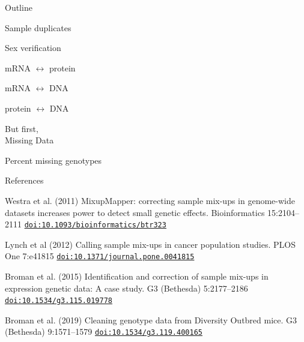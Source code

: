 \documentclass[12pt,t,aspectratio=169]{beamer}
\begin{document}
\begin{frame}[c]{Outline}

  \bbi
\item Sample duplicates
\item Sex verification
\item mRNA $\leftrightarrow$ protein
\item mRNA $\leftrightarrow$ DNA
\item protein $\leftrightarrow$ DNA
  \ei

\end{frame}




\begin{frame}[c]{}

  \centering
  \LARGE

  {\color{title} But first,} \\[24pt]

  {\vhilit Missing Data}

\end{frame}


\begin{frame}[c]{Percent missing genotypes}
\end{frame}










\begin{frame}[c]{References}

  \bbi

  \item Westra et al. (2011) MixupMapper: correcting sample mix-ups in
    genome-wide datasets increases power to detect small genetic
    effects. Bioinformatics 15:2104--2111
    \href{https://doi.org/10.1093/bioinformatics/btr323}{\tt doi:10.1093/bioinformatics/btr323}

  \item Lynch et al (2012) Calling sample mix-ups in cancer population
    studies. PLOS One 7:e41815
    \href{https://doi.org/10.1371/journal.pone.0041815}{\tt doi:10.1371/journal.pone.0041815}

  \item Broman et al. (2015) Identification and correction of sample
    mix-ups in expression genetic data: A case study. G3 (Bethesda)
    5:2177--2186
    \href{https://doi.org/10.1534/g3.115.019778}{\tt doi:10.1534/g3.115.019778}

  \item Broman et al. (2019) Cleaning genotype data from Diversity
    Outbred mice. G3 (Bethesda) 9:1571--1579
    \href{https://doi.org/10.1534/g3.119.400165}{\tt doi:10.1534/g3.119.400165}

  \ei

\end{frame}
\end{document}
